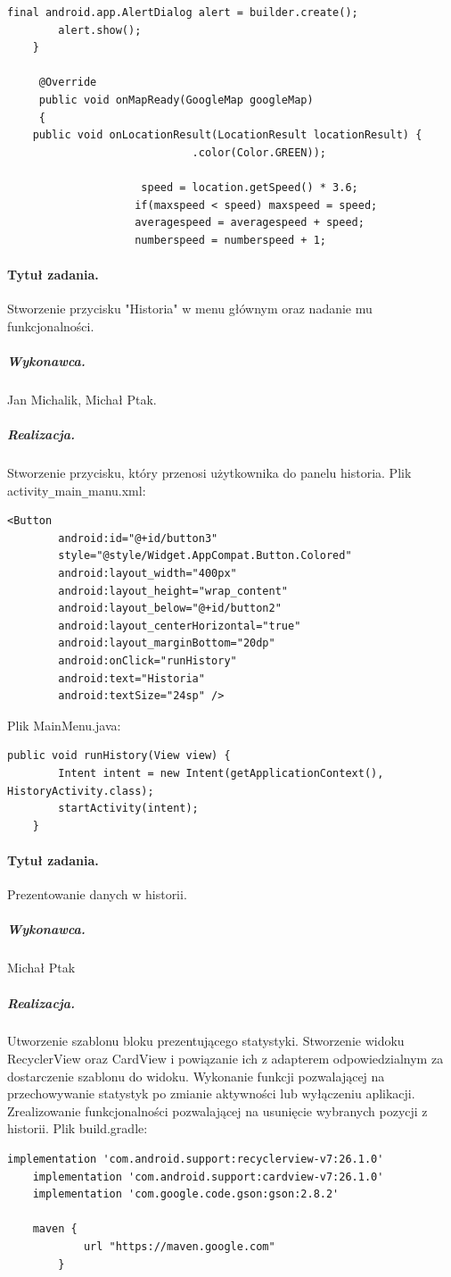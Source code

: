 \documentclass[a4paper]{article}
\begin{document}
\begin{lstlisting}[style=java]
        final android.app.AlertDialog alert = builder.create();
        alert.show();
    }

     @Override
     public void onMapReady(GoogleMap googleMap)
     {
    public void onLocationResult(LocationResult locationResult) {
                             .color(Color.GREEN));
 
                     speed = location.getSpeed() * 3.6;
                    if(maxspeed < speed) maxspeed = speed;
                    averagespeed = averagespeed + speed;
                    numberspeed = numberspeed + 1;
\end{lstlisting}


\paragraph{Tytuł zadania.} Stworzenie przycisku "Historia" w menu głównym oraz nadanie mu funkcjonalności.
\subparagraph{Wykonawca.} Jan Michalik, Michał Ptak.
\subparagraph{Realizacja.} Stworzenie przycisku, który przenosi użytkownika do panelu historia.
Plik activity\verb|_|main\verb|_|manu.xml:
\begin{lstlisting}[style=xml]
<Button
        android:id="@+id/button3"
        style="@style/Widget.AppCompat.Button.Colored"
        android:layout_width="400px"
        android:layout_height="wrap_content"
        android:layout_below="@+id/button2"
        android:layout_centerHorizontal="true"
        android:layout_marginBottom="20dp"
        android:onClick="runHistory"
        android:text="Historia"
        android:textSize="24sp" />
\end{lstlisting}
Plik MainMenu.java:
\begin{lstlisting}[style=java]
 public void runHistory(View view) {
        Intent intent = new Intent(getApplicationContext(), HistoryActivity.class);
        startActivity(intent);
    }

\end{lstlisting}

\paragraph{Tytuł zadania.} Prezentowanie danych w historii.
\subparagraph{Wykonawca.} Michał Ptak
\subparagraph{Realizacja.} Utworzenie szablonu bloku prezentującego statystyki. Stworzenie widoku RecyclerView oraz CardView i powiązanie ich z adapterem odpowiedzialnym za dostarczenie szablonu do widoku. Wykonanie funkcji pozwalającej na przechowywanie statystyk po zmianie aktywności lub wyłączeniu aplikacji. Zrealizowanie funkcjonalności pozwalającej na usunięcie wybranych pozycji z historii.
Plik build.gradle:
\begin{lstlisting}[style=java]
    implementation 'com.android.support:recyclerview-v7:26.1.0'
    implementation 'com.android.support:cardview-v7:26.1.0'
    implementation 'com.google.code.gson:gson:2.8.2'
    
    maven {
            url "https://maven.google.com"
        }
\end{lstlisting}
\end{document}
